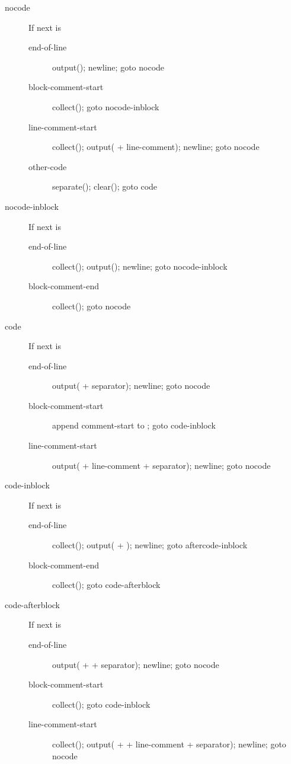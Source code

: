 \begin{description}
\item[nocode] If next is
  \begin{description}
  \item[end-of-line] output(); newline; goto nocode
  \item[block-comment-start] collect(); goto nocode-inblock
  \item[line-comment-start] collect(); output( + line-comment); newline; goto nocode
  \item[other-code] separate(); clear(); goto code
  \end{description}
\item[nocode-inblock] If next is
  \begin{description}
  \item[end-of-line] collect(); output(); newline; goto nocode-inblock
  \item[block-comment-end] collect(); goto nocode
  \end{description}
\item[code] If next is
  \begin{description}
  \item[end-of-line] output( + separator); newline; goto nocode
  \item[block-comment-start] append comment-start to ; goto code-inblock
  \item[line-comment-start] output( + line-comment + separator); newline; goto nocode
  \end{description}
\item[code-inblock] If next is
  \begin{description}
  \item[end-of-line] collect(); output( + ); newline; goto aftercode-inblock
  \item[block-comment-end] collect(); goto code-afterblock
  \end{description}
\item[code-afterblock] If next is
  \begin{description}
  \item[end-of-line] output( +  + separator); newline; goto nocode
  \item[block-comment-start] collect(); goto code-inblock
  \item[line-comment-start] collect(); output( +  + line-comment + separator); newline; goto nocode

\end{description}
\end{description}
